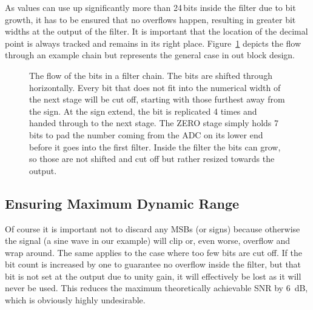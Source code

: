 As values can use up significantly  more than \num{24}\,bits inside the filter
due to bit growth, it has to be ensured that no overflows happen, resulting in
greater  bit widths at  the output  of the  filter.  It  is important  that the
location  of the  decimal point  is always  tracked and  remains in  its right
place.  Figure~\ref{fig:fpga:bitflow} depicts the flow through an example chain
but represents the general case in out block design.

\begin{figure}
    \centering
    
    \caption[Bit Flow in Filter Chain]{%
        The flow of  the bits in a filter chain. The  bits are shifted through
        horizontally. Every bit that does not fit into the numerical width of
        the next stage will be cut off, starting with those furthest away from
        the sign. At the  sign extend, the bit is replicated  \num{4} times and
        handed through to the next  stage. The ZERO stage simply holds \num{7}
         bits to pad the number coming from the ADC on its lower end
        before it goes  into the first filter. Inside the filter  the bits can
        grow, so those are not shifted  and cut off but rather resized towards
        the output.%
    }
    \label{fig:fpga:bitflow}
\end{figure}

%
%
\subsection{Ensuring Maximum Dynamic Range} %
\label{subsec:fpga:maximize_dynamic_range}

Of course it is important not to discard any MSBs (or signs) because otherwise
the signal (a sine wave in our example) will clip or, even worse, overflow and
wrap around. The same applies  to the case where too few  bits are cut off. If
the bit count is increased by one  to guarantee no overflow inside the filter,
but that bit is  not set at the output due to unity  gain, it will effectively
be lost  as it  will never  be used.  This  reduces the  maximum theoretically
achievable SNR by \SI{6}{\dB}, which is obviously highly undesirable.

